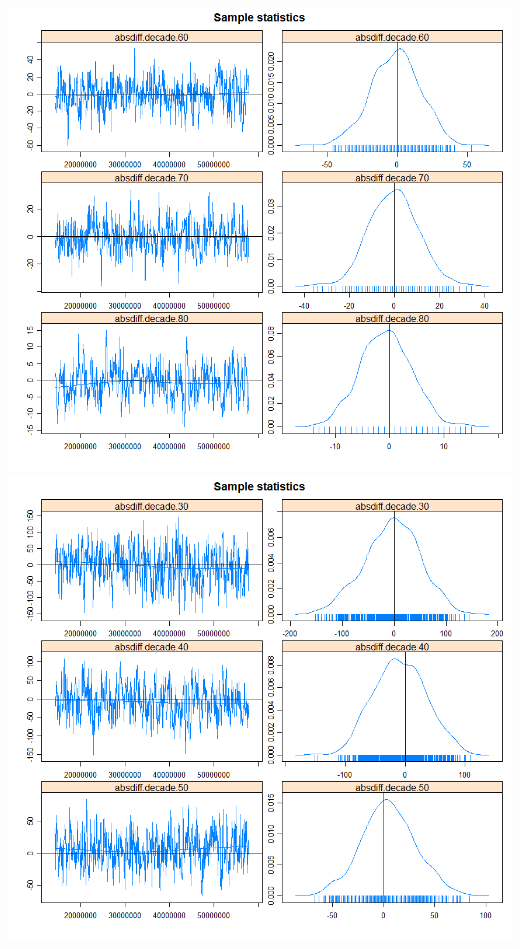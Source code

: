 \documentclass[
  english,
  man,floatsintext]{apa6}
\begin{document}
\includegraphics{ergm_result/mcmc_diagnostics_1.png}
\includegraphics{ergm_result/mcmc_diagnostics_2.png}
\end{document}
